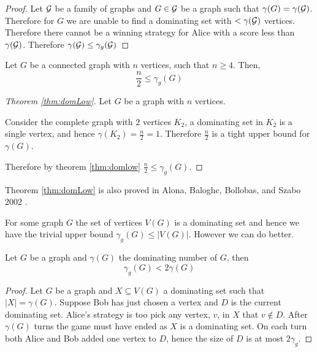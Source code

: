 \begin{proof}
    Let $\mathcal{G}$ be a family of graphs and $G\in\mathcal{G}$ be a graph such that $\gamma(G) = \gamma(\mathcal{G})$.
    Therefore for $G$ we are unable to find a dominating set with $ <\gamma(\mathcal{G}) $ vertices.
    Therefore there cannot be a winning strategy for Alice with a score less than $\gamma(\mathcal{G})$.
    Therefore $\gamma(\mathcal{G}) \leq \gamma_g(\mathcal{G})$
\end{proof}


\begin{corollary} \label{thm:domLow}
    Let $G$ be a connected graph with $n$ vertices, such that $n \geq 4$. Then,    
    \[  \frac{n}{2} \leq \gamma_g(G)  \]    
\end{corollary}

\begin{proof}[Theorem \ref{thm:domLow}]
    Let $G$ be a graph with $n$ vertices.
    
    Consider the complete graph with $2$ vertices $K_2$, a dominating set in $K_2$ is a single vertex, and hence $\gamma(K_2)=\frac{n}{2}=1$. Therefore $\frac{n}{2}$ is a tight upper bound for $\gamma(G)$. 
    
    Therefore by theorem \ref{thm:domlow} $ \frac{n}{2} \leq \gamma_g(G)$.
\end{proof}

Theorem \ref{thm:domLow} is also proved in Alona, Baloghc, Bollobas, and Szabo 2002 \cite{AlBABoSz2002}.

For some graph $G$ the set of vertices $V(G)$ is a dominating set and hence we have the trivial upper bound $\gamma_g(G) \leq |V(G)|$. However we can do better.

\begin{theorem}
    Let $G$ be a graph and $\gamma(G)$ the dominating number of $G$, then 
    \[\gamma_g(G)<2\gamma(G)\]
\end{theorem}
\begin{proof}
    Let $G$ be a graph and $X\subseteq V(G)$ a dominating set such that $|X| = \gamma(G)$. Suppose Bob has just chosen a vertex and $D$ is the current dominating set. Alice's strategy is too pick any vertex, $v$, in $X$ that $v\notin D$. After $\gamma(G)$ turns the game must have ended as $X$ is a dominating set. On each turn both Alice and Bob added one vertex to $D$, hence the size of $D$ is at most $2\gamma_g$.
\end{proof}

